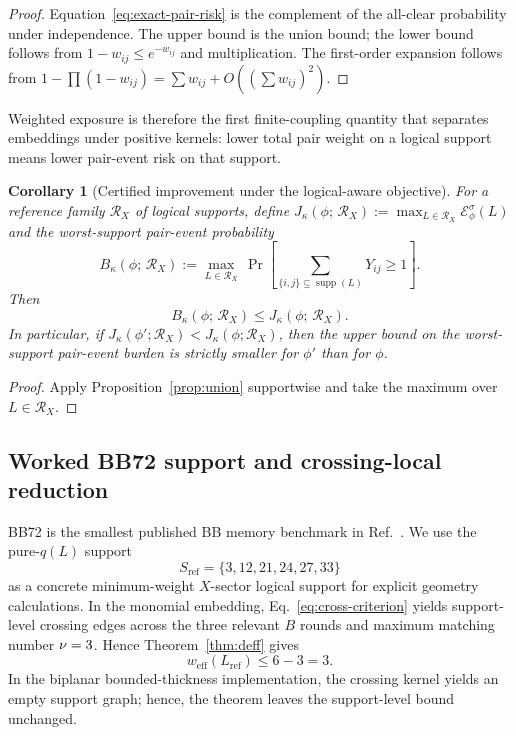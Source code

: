 \documentclass[
aps,
prx,
10pt,
twocolumn,
groupedaddress,
longbibliography,
nofootinbib,
floatfix
]{revtex4-2}
\newtheorem{corollary}{Corollary}
\theoremstyle{definition}
\DeclareMathOperator{\supp}{supp}
\newcommand{\Ew}{\mathcal{E}}
\newcommand{\RX}{\mathcal{R}_X}
\begin{document}
\begin{proof}
Equation~\eqref{eq:exact-pair-risk} is the complement of the all-clear probability under independence. The upper bound is the union bound; the lower bound follows from $1-w_{ij}\le e^{-w_{ij}}$ and multiplication. The first-order expansion follows from $1-\prod(1-w_{ij})=\sum w_{ij}+O((\sum w_{ij})^2)$.
\end{proof}

Weighted exposure is therefore the first finite-coupling quantity that separates embeddings under positive kernels: lower total pair weight on a logical support means lower pair-event risk on that support.

\begin{corollary}[Certified improvement under the logical-aware objective]
\label{cor:certified-Jkappa}
For a reference family $\RX$ of logical supports, define $J_{\kappa}(\phi;\,\RX):=\max_{L\in\RX}\Ew_{\phi}^{\sigma}(L)$ and the worst-support pair-event probability
\begin{equation}
B_{\kappa}(\phi;\,\RX)
:=
\max_{L\in\RX}\,
\Pr\!\left[\textstyle\sum_{\{i,j\}\subseteq\supp(L)} Y_{ij}\ge 1\right].
\end{equation}
Then
\begin{equation}
B_{\kappa}(\phi;\,\RX)\le J_{\kappa}(\phi;\,\RX).
\end{equation}
In particular, if $J_{\kappa}(\phi'; \RX)<J_{\kappa}(\phi; \RX)$, then the upper bound on the worst-support pair-event burden is strictly smaller for $\phi'$ than for $\phi$.
\end{corollary}

\begin{proof}
Apply Proposition~\ref{prop:union} supportwise and take the maximum over $L\in\RX$.
\end{proof}

\subsection{Worked BB72 support and crossing-local reduction}

BB72 is the smallest published BB memory benchmark in Ref.~. We use the pure-$q(L)$ support
\begin{equation}
S_{\mathrm{ref}}=\{3,12,21,24,27,33\}
\label{eq:ref-support}
\end{equation}
as a concrete minimum-weight $X$-sector logical support for explicit geometry calculations. In the monomial embedding, Eq.~\eqref{eq:cross-criterion} yields \bbSeventyTwoCrossSupportCrossings{} support-level crossing edges across the three relevant $B$ rounds and maximum matching number $\nu=3$. Hence Theorem~\ref{thm:deff} gives
\begin{equation}
w_{\mathrm{eff}}(L_{\mathrm{ref}})\le 6-3=3.
\end{equation}
In the biplanar bounded-thickness implementation, the crossing kernel yields an empty support graph; hence, the theorem leaves the support-level bound unchanged.
\end{document}
